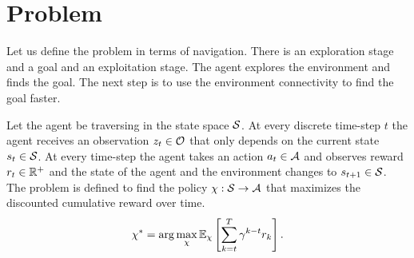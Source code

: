 \section{Problem}
Let us define the problem in terms of navigation.
There is an exploration stage and a goal and an exploitation stage.
The agent explores the environment and finds the goal.
The next step is to use the environment connectivity to find the goal
faster.

Let the agent be traversing in the state space $\mathcal{S}$.
At every discrete time-step $t$ the agent receives an observation
$z_t \in \mathcal{O}$ that only depends on the current state
$s_t \in \mathcal{S}$.
At every time-step the agent takes an action $a_t \in \mathcal{A}$
and observes reward $r_t \in \mathbb{R}^+$ and the state of the agent
and the environment changes to $s_{t+1} \in \mathcal{S}$.
The problem is defined to find the policy $\chi : \mathcal{S}
\rightarrow \mathcal{A}$ that 
maximizes the discounted cumulative reward over time.
%
\begin{align}
  \chi^* = \arg \max_{\chi} \mathbb{E}_\chi \left[ \sum_{k=t}^T \gamma^{k-t} r_k \right].
\end{align}%
%
